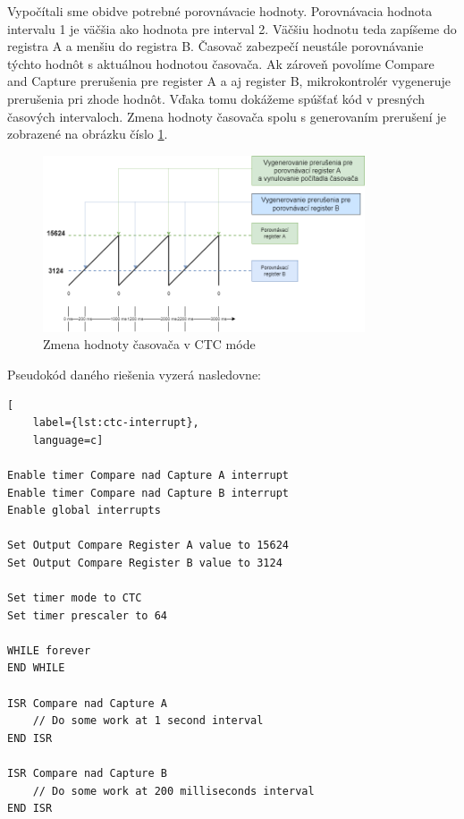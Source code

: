 Vypočítali sme obidve potrebné porovnávacie hodnoty. Porovnávacia hodnota intervalu 1 je väčšia ako hodnota pre interval 2. Väčšiu hodnotu teda zapíšeme do registra A a
menšiu do registra B. Časovač zabezpečí neustále porovnávanie týchto hodnôt s aktuálnou hodnotou časovača. Ak zároveň povolíme Compare and Capture prerušenia pre register
A a aj register B, mikrokontrolér vygeneruje prerušenia pri zhode hodnôt. Vďaka tomu dokážeme spúšťať kód v presných časových intervaloch. Zmena hodnoty časovača spolu
s generovaním prerušení je zobrazené na obrázku číslo \ref{figure:ctc-timer-value}.
\begin{figure}[!h]
    \centering
    \includegraphics[width=0.85\textwidth]{img/ctc-timer-value.png}
    \caption{Zmena hodnoty časovača v CTC móde}
    \label{figure:ctc-timer-value}
\end{figure}

Pseudokód daného riešenia vyzerá nasledovne:

\begin{lstlisting}[
    label={lst:ctc-interrupt},
    language=c]  

Enable timer Compare nad Capture A interrupt
Enable timer Compare nad Capture B interrupt
Enable global interrupts

Set Output Compare Register A value to 15624
Set Output Compare Register B value to 3124

Set timer mode to CTC
Set timer prescaler to 64

WHILE forever
END WHILE

ISR Compare nad Capture A
    // Do some work at 1 second interval
END ISR

ISR Compare nad Capture B
    // Do some work at 200 milliseconds interval 
END ISR

\end{lstlisting}

